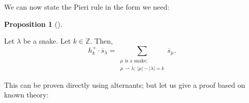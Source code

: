 \documentclass[numbers=enddot,12pt,final,onecolumn,notitlepage]{scrartcl}%
\theoremstyle{definition}
\newtheorem{prop}[theo]{Proposition}
\newenvironment{proposition}[1][]
{\begin{prop}[#1]\begin{leftbar}}
{\end{leftbar}\end{prop}}
\let\sumnonlimits\sum
\renewcommand{\sum}{\sumnonlimits\limits}
\begin{document}
We can now state the Pieri rule in the form we need:

\begin{proposition}
\label{prop.alt.pieri1}Let $\lambda$ be a snake. Let $k\in\mathbb{Z}$. Then,%
\begin{equation}
h_{k}^{+}\cdot\overline{s}_{\lambda}=\sum_{\substack{\mu\text{ is a
snake;}\\\mu\rightharpoonup\lambda;\ \left\vert \mu\right\vert -\left\vert
\lambda\right\vert =k}}\overline{s}_{\mu}. \label{eq.prop.alt.pieri1.eq}%
\end{equation}

\end{proposition}

This can be proven directly using alternants; but let us give a proof based on
known theory:
\end{document}

